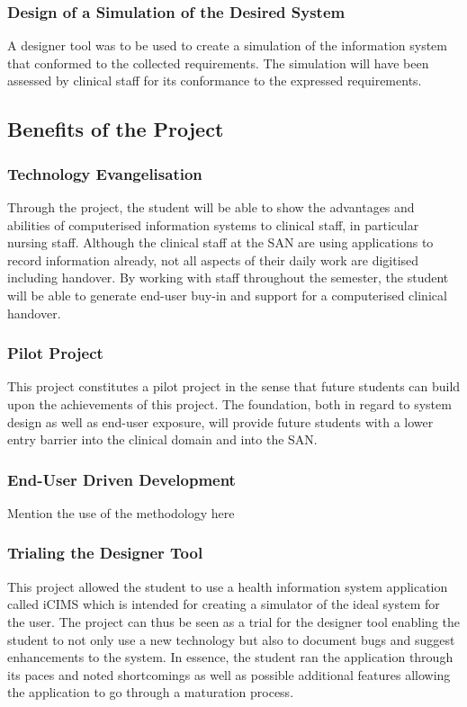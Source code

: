 \subsubsection{Design of a Simulation of the Desired System}
A designer tool was to be used to create a simulation of the information system that conformed to the collected requirements. The simulation will have been assessed by clinical staff for its conformance to the expressed requirements.

\subsection{Benefits of the Project}
\subsubsection{Technology Evangelisation}
Through the project, the student will be able to show the advantages and abilities of computerised information systems to clinical staff, in particular nursing staff. Although the clinical staff at the SAN are using applications to record information already, not all aspects of their daily work are digitised including handover. By working with staff throughout the semester, the student will be able to generate end-user buy-in and support for a computerised clinical handover.

\newpage
\subsubsection{Pilot Project}
This project constitutes a pilot project in the sense that future students can build upon the achievements of this project. The foundation, both in regard to system design as well as end-user exposure, will provide future students with a lower entry barrier into the clinical domain and into the SAN.

\subsubsection{End-User Driven Development}

Mention the use of the methodology here

\subsubsection{Trialing the Designer Tool}
This project allowed the student to use a health information system application called \gls{iCIMS} which is intended for creating a simulator of the ideal system for the user. The project can thus be seen as a trial for the designer tool enabling the student to not only use a new technology but also to document bugs and suggest enhancements to the system. In essence, the student ran the application through its paces and noted shortcomings as well as possible additional features allowing the application to go through a maturation process. 